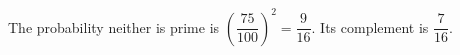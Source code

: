 The probability neither is prime is $(\dfrac{75}{100})^2=\dfrac{9}{16}$. Its complement is $\boxed{\dfrac{7}{16}}$.
